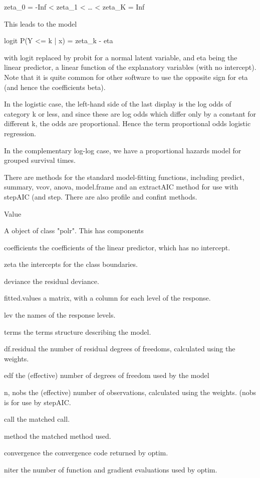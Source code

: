 zeta_0 = -Inf < zeta_1 < … < zeta_K = Inf

This leads to the model

logit P(Y <= k | x) = zeta_k - eta

with logit replaced by probit for a normal latent variable, and eta being the linear predictor, a linear function of the explanatory variables (with no intercept). Note that it is quite common for other software to use the opposite sign for eta (and hence the coefficients beta).

In the logistic case, the left-hand side of the last display is the log odds of category k or less, and since these are log odds which differ only by a constant for different k, the odds are proportional. Hence the term proportional odds logistic regression.

In the complementary log-log case, we have a proportional hazards model for grouped survival times.

There are methods for the standard model-fitting functions, including predict, summary, vcov, anova, model.frame and an extractAIC method for use with stepAIC (and step. There are also profile and confint methods.

Value

A object of class "polr". This has components

coefficients	
the coefficients of the linear predictor, which has no intercept.

zeta	
the intercepts for the class boundaries.

deviance	
the residual deviance.

fitted.values	
a matrix, with a column for each level of the response.

lev	
the names of the response levels.

terms	
the terms structure describing the model.

df.residual	
the number of residual degrees of freedoms, calculated using the weights.

edf	
the (effective) number of degrees of freedom used by the model

n, nobs	
the (effective) number of observations, calculated using the weights. (nobs is for use by stepAIC.

call	
the matched call.

method	
the matched method used.

convergence	
the convergence code returned by optim.

niter	
the number of function and gradient evaluations used by optim.

